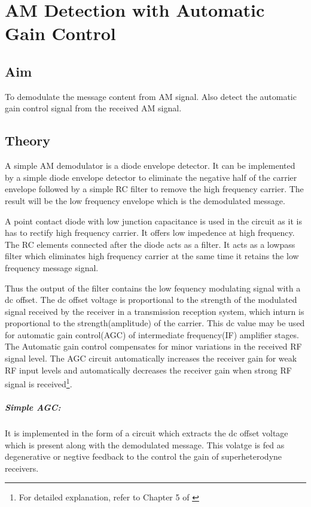 \chapter[AM Detection with Automatic Gain Control]{AM Detection with Automatic Gain Control}
\label{agcdetect}
\section*{Aim}
To demodulate the message content from AM signal. Also detect the automatic gain control signal from the received AM signal.
\section*{Theory}


A simple AM demodulator is a diode envelope detector. It can be implemented by a simple diode envelope detector to eliminate the negative half of the carrier envelope followed by a simple RC filter to remove the high frequency carrier. The result will be the low frequency envelope which is the demodulated message.

A point contact diode with low junction capacitance is used in the circuit as it is has to rectify high frequency carrier. It offers low impedence at high frequency. The RC elements connected after the diode acts as a filter. It acts as a lowpass filter which eliminates high frequency carrier at the same time it retains the low frequency message signal. 

Thus the output of the filter contains the low fequency modulating signal with a dc offset. The dc offset voltage is proportional to the strength of the modulated signal received by the receiver in a transmission reception system, which inturn is proportional to the strength(amplitude) of the carrier. This dc value may be used for automatic gain control(AGC) of intermediate frequency(IF) amplifier stages. The Automatic gain control compensates for minor variations in the received RF signal level. The AGC circuit automatically increases the receiver gain for weak RF input levels and automatically decreases the receiver gain when strong RF signal is received\footnote{For detailed explanation, refer to Chapter 5 of \cite{Tomasi}}.
\paragraph{Simple AGC:} It is implemented in the form of a circuit which extracts the dc offset voltage which is present along with the demodulated message. This volatge is fed as degenerative or negtive feedback to the control the gain of superheterodyne receivers. 
